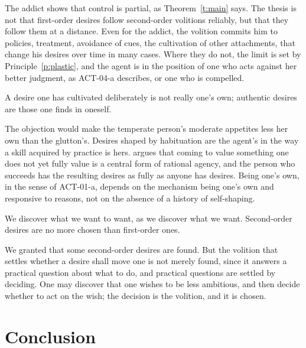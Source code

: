 \documentclass{situationist-preprint}
\begin{document}
\begin{reply}
The addict shows that control is partial, as Theorem~\ref{t:main} says. The thesis is not that first-order desires follow second-order volitions reliably, but that they follow them at a distance. Even for the addict, the volition commits him to policies, treatment, avoidance of cues, the cultivation of other attachments, that change his desires over time in many cases. Where they do not, the limit is set by Principle~\ref{p:plastic}, and the agent is in the position of one who acts against her better judgment, as ACT-04-a describes, or one who is compelled.
\end{reply}

\begin{objection}[Inauthenticity]
A desire one has cultivated deliberately is not really one's own; authentic desires are those one finds in oneself.
\end{objection}

\begin{reply}
The objection would make the temperate person's moderate appetites less her own than the glutton's. Desires shaped by habituation are the agent's in the way a skill acquired by practice is hers. \citet{Callard2018} argues that coming to value something one does not yet fully value is a central form of rational agency, and the person who succeeds has the resulting desires as fully as anyone has desires. Being one's own, in the sense of ACT-01-a, depends on the mechanism being one's own and responsive to reasons, not on the absence of a history of self-shaping.
\end{reply}

\begin{objection}
We discover what we want to want, as we discover what we want. Second-order desires are no more chosen than first-order ones.
\end{objection}

\begin{reply}
We granted that some second-order desires are found. But the volition that settles whether a desire shall move one is not merely found, since it answers a practical question about what to do, and practical questions are settled by deciding. One may discover that one wishes to be less ambitious, and then decide whether to act on the wish; the decision is the volition, and it is chosen.
\end{reply}

\section{Conclusion}
\end{document}
